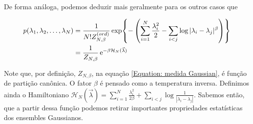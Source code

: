De forma análoga, podemos deduzir mais geralmente para os outros casos que

\begin{equation}
	\begin{split}
		p(\lambda_1, \lambda_2, \dots, \lambda_N) 
		&= \frac{1}{ N! Z_{N, \beta}^{(ord)}} \exp{- \left(\sum_{i = 1}^{N} \frac{\lambda_i^2}{2} - \sum_{i < j} \log{|\lambda_i - \lambda_j|^{\beta}} \right)} \\
		&= \frac{1}{Z_{N, \beta}} \operatorname{\textrm e}^{-\beta \mathcal{H}_N(\vec{\lambda})}
	\end{split}
\label{Equation: medida Gaussian}
\end{equation}

Note que, por definição, $Z_{N, \beta}$, na equação \ref{Equation: medida Gaussian}, é função de partição canônica. O fator $\beta$ é pensado como a temperatura inversa. Definimos ainda o Hamiltoniano $\mathcal{H}_N(\vec{\lambda}) = \sum_{i = 1}^{N} \frac{\lambda_i^2}{2 \beta} + \sum_{i < j} \log{\frac{1}{|\lambda_i - \lambda_j|}}.$ Sabemos então, que a partir dessa função podemos retirar importantes propriedades estatísticas dos ensembles Gaussianos.

